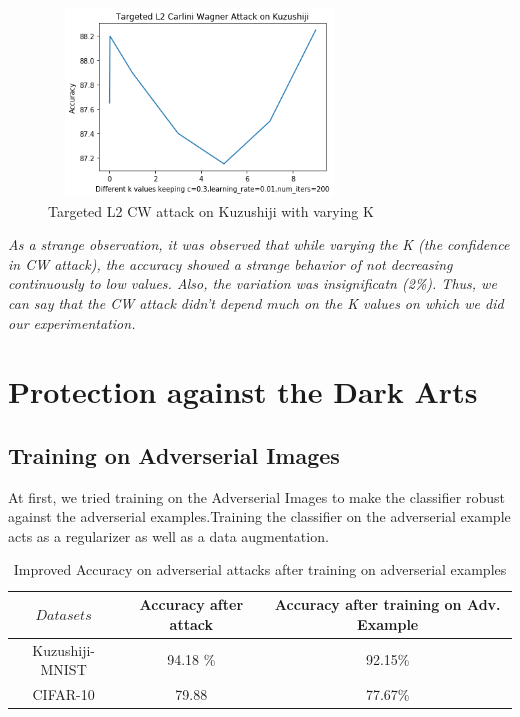 \documentclass[11pt]{article}
\begin{document}
\begin{center}
        \begin{figure}[!h]
        \centering
          \includegraphics[width=80mm, height=50mm]{CW_kuzu_K_values.png}
          \caption{ Targeted L2 CW attack on Kuzushiji with varying K
          }
          \label{fig:Piston}
        \end{figure}
\end{center}

\emph{As a strange observation, it was observed that while varying the K (the confidence in CW attack), the accuracy showed a strange behavior of not decreasing continuously to low values. Also, the variation was insignificatn (2\%). Thus, we can say that the CW attack didn't depend much on the K values on which we did our experimentation.}

\section{Protection against the Dark Arts}
\subsection{Training on Adverserial Images}
At first, we tried training on the Adverserial Images to make the classifier robust against the adverserial examples.Training the classifier on the adverserial example acts as a regularizer as well as a data augmentation. 
\begin{table}[!h]
\centering
\begin{tabular}{c|c|c}
$Datasets$& Accuracy after attack & Accuracy after training on Adv. Example  \\\hline
Kuzushiji-MNIST	& 94.18 \%  & 92.15\%\\
CIFAR-10 & 79.88 & 77.67\% 

\end{tabular}
\caption{\label{Table 1: }Improved Accuracy on adverserial attacks after training on adverserial examples}
\end{table}
\\
\end{document}
